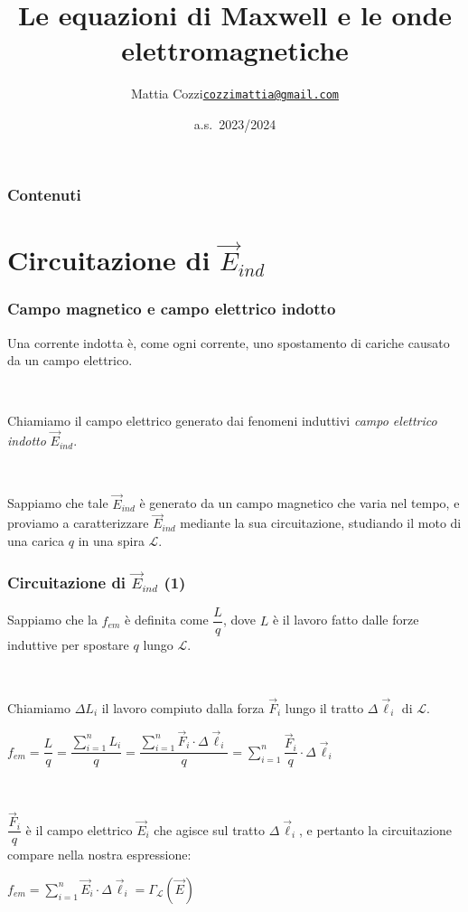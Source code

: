 \documentclass[]{beamer}
\title{Le equazioni di Maxwell e le onde elettromagnetiche}
\author{\texorpdfstring{Mattia Cozzi\newline\href{mailto:cozzimattia@gmail.com}{\texttt{cozzimattia@gmail.com}}}{Mattia Cozzi}}
\date{a.s.~2023/2024}
\theoremstyle{plain}
\newcommand{\fem}{f_{em}}
\begin{document}
\begin{frame}
  \titlepage
\end{frame}





\begin{frame}
\frametitle{Contenuti}
\tableofcontents
\end{frame}


\section{Circuitazione di $ \vec{E}_{ind} $}

\begin{frame}
\frametitle{Campo magnetico e campo elettrico indotto}
\alert<1>{Una corrente indotta è}, come ogni corrente, \alert<1>{uno spostamento di cariche causato da un campo elettrico}.

~\pause

Chiamiamo il campo elettrico generato dai fenomeni induttivi \emph{campo elettrico indotto} $ \vec{E}_{ind} $.

~\pause

Sappiamo che tale $ \vec{E}_{ind} $ è generato da un campo magnetico che varia nel tempo, e \alert<3>{proviamo a caratterizzare $ \vec{E}_{ind} $ mediante la sua circuitazione}, studiando il moto di una carica $ q $ in una spira $ \mathscr{L} $.
\end{frame}


\begin{frame}
\frametitle{Circuitazione di $ \vec{E}_{ind} $ (1)}
Sappiamo che la $ \fem $ è definita come $ \dfrac{L}{q} $, dove $ L $ è il lavoro fatto dalle forze induttive per spostare $ q $ lungo $ \mathscr{L} $.

~\pause

Chiamiamo $ \Delta L_i $ il lavoro compiuto  dalla forza $ \vec{F}_i $ lungo il tratto $ \Delta\vec{\ell}_i $ di $ \mathscr{L} $.\pause
\begin{center}
$ \fem = \dfrac{L}{q} = \dfrac{\sum\limits_{i=1}^n L_i}{q} = \dfrac{\sum\limits_{i=1}^n \vec{F}_i \cdot \Delta\vec{\ell}_i }{q} = \sum\limits_{i=1}^n \dfrac{ \vec{F}_i }{q} \cdot \Delta\vec{\ell}_i $
\end{center}

~\pause

\alert<4>{$ \dfrac{ \vec{F}_i }{q} $ è il campo elettrico $ \vec{E}_i $ che agisce sul tratto $ \Delta\vec{\ell}_i $}, e pertanto la circuitazione compare nella nostra espressione:
\begin{center}
$ \fem = \sum\limits_{i=1}^n \vec{E}_i \cdot \Delta\vec{\ell}_i = \Gamma_\mathscr{L} (\vec{E}) $
\end{center}
\end{frame}
\end{document}

